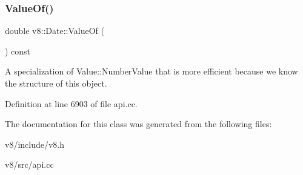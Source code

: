 \subsubsection{\texorpdfstring{Value\+Of()}{ValueOf()}}
{\footnotesize\ttfamily double v8\+::\+Date\+::\+Value\+Of (\begin{DoxyParamCaption}{ }\end{DoxyParamCaption}) const}

A specialization of Value\+::\+Number\+Value that is more efficient because we know the structure of this object. 

Definition at line 6903 of file api.\+cc.



The documentation for this class was generated from the following files\+:\begin{DoxyCompactItemize}
\item 
v8/include/v8.\+h\item 
v8/src/api.\+cc\end{DoxyCompactItemize}
